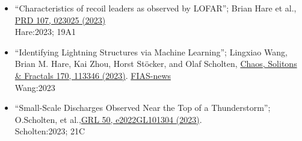 \documentclass[fleqn,11pt]{article}
\begin{document}
\begin{itemize}
\begin{itemize}
\item ``Characteristics of recoil leaders as observed by LOFAR''; Brian Hare et al.,
    \href{https://doi.org/10.1103/PhysRevD.107.023025}{PRD 107, 023025 (2023)}
    \\Hare:2023; 19A1

\item ``Identifying Lightning Structures via Machine Learning'';
   Lingxiao Wang, Brian M. Hare, Kai Zhou, Horst St\"{o}cker, and Olaf Scholten,
   \href{https://doi.org/10.1016/j.chaos.2023.113346}{Chaos, Solitons \& Fractals 170, 113346 (2023)}.
   \href{https://fias.news/en/news-publicity/algorithms-illuminate-lightning-structures/?bid=3}{FIAS-news}
   \\Wang:2023

\item ``Small-Scale Discharges Observed Near the Top of a Thunderstorm''; O.Scholten, et al.,\href{http://doi.org/10.1029/2022GL101304}{GRL 50, e2022GL101304 (2023)}.
    \\Scholten:2023; 21C

\end{itemize}
\end{itemize}
\end{document}

